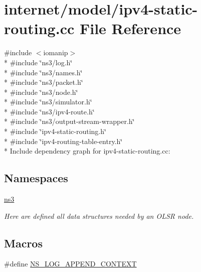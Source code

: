 \hypertarget{ipv4-static-routing_8cc}{}\section{internet/model/ipv4-\/static-\/routing.cc File Reference}
\label{ipv4-static-routing_8cc}
{\ttfamily \#include $<$iomanip$>$}\\*
{\ttfamily \#include \char`\"{}ns3/log.\+h\char`\"{}}\\*
{\ttfamily \#include \char`\"{}ns3/names.\+h\char`\"{}}\\*
{\ttfamily \#include \char`\"{}ns3/packet.\+h\char`\"{}}\\*
{\ttfamily \#include \char`\"{}ns3/node.\+h\char`\"{}}\\*
{\ttfamily \#include \char`\"{}ns3/simulator.\+h\char`\"{}}\\*
{\ttfamily \#include \char`\"{}ns3/ipv4-\/route.\+h\char`\"{}}\\*
{\ttfamily \#include \char`\"{}ns3/output-\/stream-\/wrapper.\+h\char`\"{}}\\*
{\ttfamily \#include \char`\"{}ipv4-\/static-\/routing.\+h\char`\"{}}\\*
{\ttfamily \#include \char`\"{}ipv4-\/routing-\/table-\/entry.\+h\char`\"{}}\\*
Include dependency graph for ipv4-\/static-\/routing.cc\+:
\subsection*{Namespaces}
\begin{DoxyCompactItemize}
\item 
 \hyperlink{namespacens3}{ns3}
\begin{DoxyCompactList}\small\item\em Here are defined all data structures needed by an O\+L\+SR node. \end{DoxyCompactList}\end{DoxyCompactItemize}
\subsection*{Macros}
\begin{DoxyCompactItemize}
\item 
\#define \hyperlink{ipv4-static-routing_8cc_abe50035652d407c40bdaef78214c4955}{N\+S\+\_\+\+L\+O\+G\+\_\+\+A\+P\+P\+E\+N\+D\+\_\+\+C\+O\+N\+T\+E\+XT}
\end{DoxyCompactItemize}
